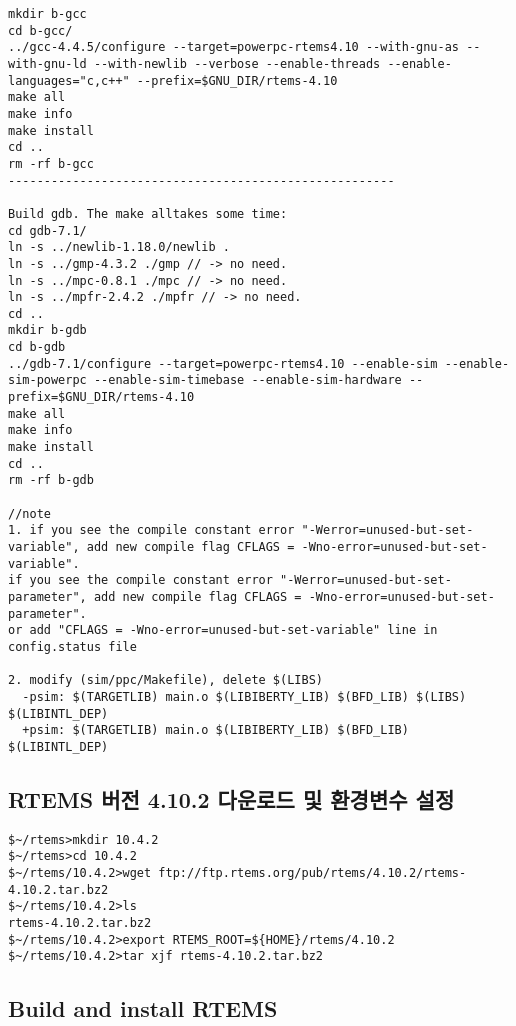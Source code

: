\documentclass[11pt
  , a4paper
  , article
  , oneside
]{memoir}
\begin{document}
\begin{lstlisting}[style=termstyle]
mkdir b-gcc
cd b-gcc/
../gcc-4.4.5/configure --target=powerpc-rtems4.10 --with-gnu-as --with-gnu-ld --with-newlib --verbose --enable-threads --enable-languages="c,c++" --prefix=$GNU_DIR/rtems-4.10
make all
make info
make install
cd ..
rm -rf b-gcc
------------------------------------------------------

Build gdb. The make alltakes some time:
cd gdb-7.1/
ln -s ../newlib-1.18.0/newlib .
ln -s ../gmp-4.3.2 ./gmp // -> no need.
ln -s ../mpc-0.8.1 ./mpc // -> no need.
ln -s ../mpfr-2.4.2 ./mpfr // -> no need.
cd ..
mkdir b-gdb
cd b-gdb
../gdb-7.1/configure --target=powerpc-rtems4.10 --enable-sim --enable-sim-powerpc --enable-sim-timebase --enable-sim-hardware --prefix=$GNU_DIR/rtems-4.10
make all
make info
make install
cd ..
rm -rf b-gdb

//note
1. if you see the compile constant error "-Werror=unused-but-set-variable", add new compile flag CFLAGS = -Wno-error=unused-but-set-variable".
if you see the compile constant error "-Werror=unused-but-set-parameter", add new compile flag CFLAGS = -Wno-error=unused-but-set-parameter".
or add "CFLAGS = -Wno-error=unused-but-set-variable" line in config.status file

2. modify (sim/ppc/Makefile), delete $(LIBS)
  -psim: $(TARGETLIB) main.o $(LIBIBERTY_LIB) $(BFD_LIB) $(LIBS) $(LIBINTL_DEP)
  +psim: $(TARGETLIB) main.o $(LIBIBERTY_LIB) $(BFD_LIB) $(LIBINTL_DEP)

\end{lstlisting}

\subsection*{RTEMS 버전 4.10.2 다운로드 및 환경변수 설정 }
\begin{lstlisting}[style=termstyle]
$~/rtems>mkdir 10.4.2
$~/rtems>cd 10.4.2
$~/rtems/10.4.2>wget ftp://ftp.rtems.org/pub/rtems/4.10.2/rtems-4.10.2.tar.bz2
$~/rtems/10.4.2>ls
rtems-4.10.2.tar.bz2
$~/rtems/10.4.2>export RTEMS_ROOT=${HOME}/rtems/4.10.2
$~/rtems/10.4.2>tar xjf rtems-4.10.2.tar.bz2
\end{lstlisting}


\subsection*{Build and install RTEMS}
\end{document}
